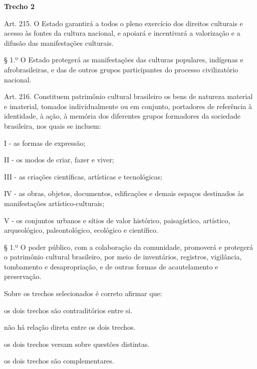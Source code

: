 \begin{myquote}

\textbf{Trecho 2}

Art. 215. O Estado garantirá a todos o pleno exercício dos direitos
culturais e acesso às fontes da cultura nacional, e apoiará e
incentivará a valorização e a difusão das manifestações culturais.

§ 1.º O Estado protegerá as manifestações das culturas populares,
indígenas e afrobrasileiras, e das de outros grupos participantes do
processo civilizatório nacional. 

Art. 216. Constituem patrimônio
cultural brasileiro os bens de natureza material e imaterial, tomados
individualmente ou em conjunto, portadores de referência à identidade, à
ação, à memória dos diferentes grupos formadores da sociedade
brasileira, nos quais se incluem:

I - as formas de expressão;

II - os modos de criar, fazer e viver;

III - as criações científicas, artísticas e tecnológicas;

IV - as obras, objetos, documentos, edificações e demais espaços
destinados às manifestações artístico-culturais;

V - os conjuntos urbanos e sítios de valor histórico, paisagístico,
artístico, arqueológico, paleontológico, ecológico e científico.

§ 1.º O poder público, com a colaboração da comunidade, promoverá e
protegerá o patrimônio cultural brasileiro, por meio de inventários,
registros, vigilância, tombamento e desapropriação, e de outras formas
de acautelamento e preservação. \\

\end{myquote}

Sobre os trechos selecionados é correto afirmar que:

\begin{escolha}

  \item os dois trechos são contraditórios entre si.

  \item não há relação direta entre os dois trechos.

  \item os dois trechos versam sobre questões distintas.

  \item os dois trechos são complementares. 

\end{escolha}

